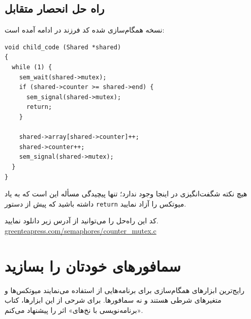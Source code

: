 \documentclass{book}
\newcommand{\clearemptydoublepage}{\newpage\cleardoublepage}
\begin{document}
\clearemptydoublepage
\subsection{راه حل انحصار متقابل}

    نسخه همگام‌سازی شده کد فرزند در ادامه آمده است:

\begin{latin}
\begin{lstlisting}
void child_code (Shared *shared)
{
  while (1) {
    sem_wait(shared->mutex);
    if (shared->counter >= shared->end) {
      sem_signal(shared->mutex);
      return;
    }

    shared->array[shared->counter]++;
    shared->counter++;
    sem_signal(shared->mutex);
  }
}
\end{lstlisting}
\end{latin}

    هیچ نکته شگفت‌انگیزی در اینجا وجود ندارد؛ تنها پیچیدگی مسأله این است که به یاد داشته باشید که پیش از دستور {\tt return} میوتکس را آزاد نمایید.
    

    کد این راه‌حل را می‌توانید از آدرس زیر دانلود نمایید.
\url{greenteapress.com/semaphores/counter_mutex.c}


\clearemptydoublepage
\section{سمافورهای خودتان را بسازید}
\label{makeyourown}

    رایج‌ترین ابزارهای همگام‌سازی برای برنامه‌هایی از  استفاده می‌نمایند میوتکس‌ها و متغیرهای شرطی هستند و نه سمافورها. 
    برای شرحی از این ابزارها، کتاب «برنامه‌نویسی با نخ‌های» 
    اثر  را پیشنهاد می‌کنم. 
\end{document}

